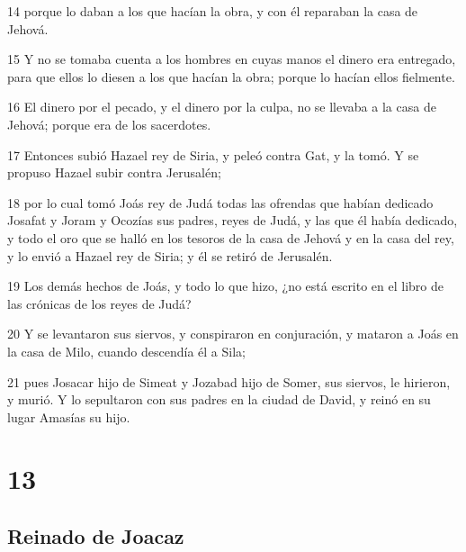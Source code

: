 \par 14 porque lo daban a los que hacían la obra, y con él reparaban la casa de Jehová.
\par 15 Y no se tomaba cuenta a los hombres en cuyas manos el dinero era entregado, para que ellos lo diesen a los que hacían la obra; porque lo hacían ellos fielmente.
\par 16 El dinero por el pecado, y el dinero por la culpa, no se llevaba a la casa de Jehová; porque era de los sacerdotes. 
\par 17 Entonces subió Hazael rey de Siria, y peleó contra Gat, y la tomó. Y se propuso Hazael subir contra Jerusalén;
\par 18 por lo cual tomó Joás rey de Judá todas las ofrendas que habían dedicado Josafat y Joram y Ocozías sus padres, reyes de Judá, y las que él había dedicado, y todo el oro que se halló en los tesoros de la casa de Jehová y en la casa del rey, y lo envió a Hazael rey de Siria; y él se retiró de Jerusalén.
\par 19 Los demás hechos de Joás, y todo lo que hizo, ¿no está escrito en el libro de las crónicas de los reyes de Judá?
\par 20 Y se levantaron sus siervos, y conspiraron en conjuración, y mataron a Joás en la casa de Milo, cuando descendía él a Sila;
\par 21 pues Josacar hijo de Simeat y Jozabad hijo de Somer, sus siervos, le hirieron, y murió. Y lo sepultaron con sus padres en la ciudad de David, y reinó en su lugar Amasías su hijo.

\chapter{13}

\section*{Reinado de Joacaz}

